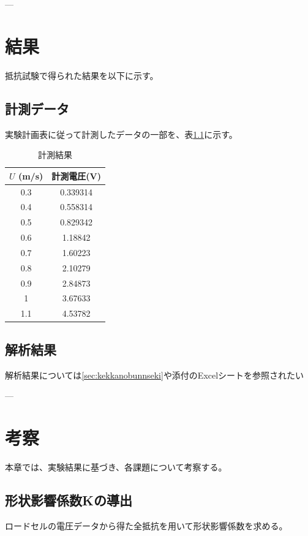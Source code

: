 \documentclass[dvipdfmx,a4paper]{jreport} %
\begin{document}
---

\chapter{結果}
抵抗試験で得られた結果を以下に示す。

\section{計測データ}
実験計画表に従って計測したデータの一部を、表\ref{tab:measurement_data_sample_booktabs}に示す。

\begin{table}[htbp]
  \centering
  \caption{計測結果}
  \label{tab:measurement_data_sample_booktabs}
  \begin{tabular}{cc}
    \toprule
    $U$ (m/s) & 計測電圧(V) \\ \midrule
    0.3       & 0.339314  \\
    0.4       & 0.558314  \\
    0.5       & 0.829342  \\
    0.6       & 1.18842   \\
    0.7       & 1.60223   \\
    0.8       & 2.10279   \\
    0.9       & 2.84873   \\
    1         & 3.67633   \\
    1.1       & 4.53782   \\ \bottomrule
  \end{tabular}
\end{table}


\section{解析結果}
解析結果については\ref{sec:kekkanobunnseki}や添付のExcelシートを参照されたい

---

\chapter{考察}
本章では、実験結果に基づき、各課題について考察する。

\section{形状影響係数Kの導出}
ロードセルの電圧データから得た全抵抗を用いて形状影響係数を求める。
\end{document}
